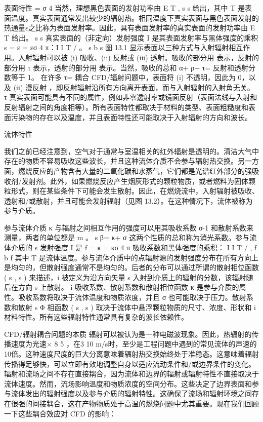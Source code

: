 \documentclass[11pt,a4paper,openany,fontset=none]{ctexbook}
\begin{document}
表面特性 = σ 4 当然，理想黑色表面的发射功率由 E T , s s 给出，其中 T 是表面温度。真实表面通常发出较少的辐射热。相同温度下真实表面与黑色表面发射的热通量ε之比称为表面发射率。因此，具有表面发射率的真实表面的发射功率由 E T 给出。 s s 真实表面的（非定向）发射强度 I 是其表面发射率与黑体强度的乘积 s = ε = εσ 4 π：I I T / 。 s b s 图 13.1 显示表面以三种方式与入射辐射相互作用。入射辐射可以被 (i) 吸收、(ii) 反射或 (iii) 透射。吸收的部分用 表示，反射的部分用 τ 表示，透射的部分用 表示。当然，吸收的总和 α+ ρ+ τ= 反射和透射分数等于 1。 在许多 τ= 耦合 CFD/辐射问题中，表面将 (i) 不透明，因此为 0，以及 (ii) 漫反射 ，即反射辐射沿所有方向离开表面，而与入射辐射的入射角无关。 τ 真实表面可能具有不同的属性，例如非零透射率或镜面反射（表面法线与入射和反射辐射之间的角度相等）。所有表面特性都取决于材料的类型、表面粗糙度和表面污染物的存在以及温度，并且表面特性还可能取决于入射辐射的方向和波长。

流体特性

我们之前已经注意到，空气对于通常与室温相关的红外辐射是透明的。清洁大气中存在的物质不容易吸收这些波长，并且这种流体介质不会参与辐射热交换。另一方面，燃烧反应的产物含有大量的二氧化碳和水蒸气，它们都是光谱红外部分的强吸收剂/发射剂。此外，如果燃烧反应产生烟灰形式的颗粒物质，或者燃料为固体颗粒形式，则在某些条件下可能会发生散射。因此，在燃烧流中，入射辐射被吸收、透射和/或散射，并且可能会发射辐射（见图 13.2）。在这种情况下，流体被称为参与介质。

参与流体介质 κ 与辐射之间相互作用的强度可以用其吸收系数 σ-1 和散射系数来测量，两者的单位都是 m 。 s β= κ+ σ 这两个性质的总和称为消光系数。参与流体介质的 s 发射强度 I 是 f = κ = κσ 4 π 吸收系数和黑体强度的乘积： I I T / , f b f
其中 T 是流体温度。参与流体介质中的点辐射源的发射强度分布在所有方向上是均匀的，但散射强度通常不是均匀的。后者的分布可以通过所谓的散射相位函数 ( s , s ) 来描述，i 被定义为沿方向矢量 s 入射到介质上的辐射的分数，该辐射随后在方向 s 上散射。 i 吸收系数、散射系数和散射相位函数 κ 是参与介质的属性。吸收系数将取决于流体温度和物质浓度，并且 σ 也可能取决于压力。散射系数和散射 s Φ 相函数 ( s , s ) 取决于流体中悬浮颗粒物质的尺寸、浓度、形状和 i 材料特性。所有这些辐射特性通常具有复杂的波长依赖性。

CFD/辐射耦合问题的本质
辐射可以被认为是一种电磁波现象。因此，热辐射的传播速度为光速× 8 5 ，在3 10 m/s时，至少是工程问题中遇到的常见流体的声速的10倍。这种速度尺度的巨大分离意味着辐射热交换始终处于准稳态。这意味着辐射传播得足够快，可以立即有效地调整自身以适应流动条件和/或边界条件的变化。辐射和流场之间不存在直接耦合，因为流体和边界的辐射或辐射特性不直接取决于流体速度。然而，流场影响温度和物质浓度的空间分布。这些决定了边界表面和参与流体发出的辐射强度以及参与介质的辐射特性。这确保了流场和辐射环境之间存在很强的间接耦合，这在产物物质处于高温的燃烧问题中尤其重要。现在我们回顾一下这些耦合效应对 CFD 的影响：
\end{document}
